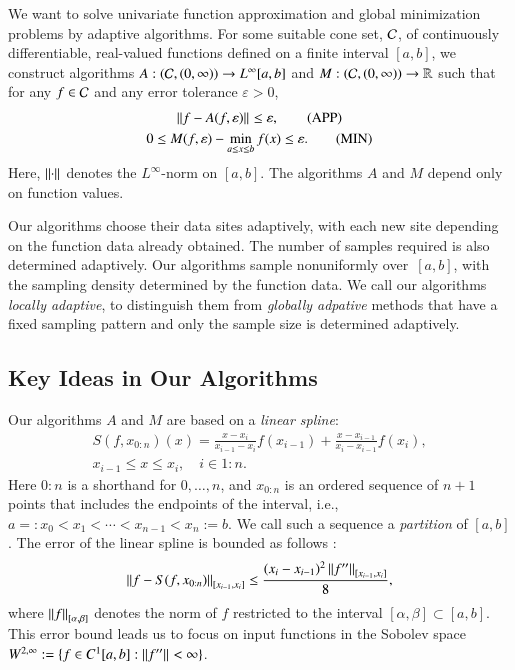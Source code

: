 \documentclass[review]{elsarticle}
\newcommand{\abstol}{\varepsilon}
\newcommand{\oton}{1\!:\!n}
\newcommand{\datasites}{x_{0:n}}
\theoremstyle{definition}
\renewcommand{\cw}{W}
\begin{document}
We want to solve univariate function approximation and global minimization
problems by adaptive algorithms. For some suitable cone set, $\cc$, of
continuously differentiable, real-valued functions defined on a finite interval
$[a,b]$, we construct algorithms $A:(\cc,(0,\infty)) \to L^{\infty}[a,b]$ and
$M: (\cc,(0,\infty)) \to \reals$ such that for any $f \in \cc$ and any error
tolerance $\abstol > 0$,
\begin{gather}
\norm{f - A(f,\abstol)} \le \abstol,  \tag{APP} \label{appxprob} \\
0 \le M(f,\abstol) - \min_{a \le x \le b} f(x)  \le \abstol. \tag{MIN} \label{optprob}
\end{gather}
Here, $\norm{\cdot}$ denotes the $L^{\infty}$-norm on $[a,b]$. The algorithms
$A$ and $M$ depend only on function values.

Our algorithms choose their data sites adaptively, with each new site depending
on the function data already obtained. The number of samples required is also
determined adaptively. Our algorithms sample nonuniformly over~$[a,b]$, with the
sampling density determined by the function data. We call our algorithms
\emph{locally adaptive}, to distinguish them from \emph{globally adpative}
methods that have a fixed sampling pattern and only the sample size is
determined adaptively.

\subsection{Key Ideas in Our Algorithms} \label{subsec:keyideas}

Our algorithms $A$ and $M$ are based on a \emph{linear spline}: 
\begin{multline} \label{splinedef}
S(f,\datasites)(x) =  \frac{x-x_i}{x_{i-1} - x_i} f(x_{i-1}) + \frac{x-x_{i-1}}{x_{i} - x_{i-1}}f(x_i), 
\\ x_{i-1} \le x \le x_i, \quad i \in \oton.
\end{multline}
Here ${0\!:\!n}$ is a shorthand for ${0, \ldots, n}$, and $\datasites$ is an
ordered sequence of $n+1$ points that includes the endpoints of the interval,
i.e., $a=:x_0 <x_1 < \cdots < x_{n-1} < x_{n}:=b$. We call such a sequence a
\emph{partition} of $[a,b]$. The error of the linear spline is bounded as
follows \cite[Theorem 3.3]{BurFaiBur16a}:
\begin{equation} \label{appxerrbda}
	\norm[{[x_{i-1},x_i]}]{f - S(f,\datasites)} \le \frac{(x_i - x_{i-1})^2\norm[{[x_{i-1},x_i]}]{f''}}{8}, 
\end{equation}
where $\norm[{[\alpha,\beta]}]{f}$ denotes the norm of $f$ restricted to the
interval $[\alpha,\beta] \subset [a,b]$. This error bound leads us to focus on
input functions in the Sobolev space $\cw^{2,\infty} := \{f \in C^1[a,b] :
\norm{f''} < \infty \}$.
\end{document}
